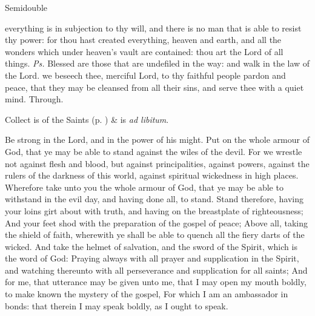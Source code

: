 \label{trinity}
\begin{inhead}
{Semidouble}
\end{inhead}
\par\noindent
{}




\properantiphonfix

\introit
{} everything is in subjection to thy will, and there is no man that is able to resist thy power: for thou hast created everything, heaven and earth, and all the wonders which under heaven's vault are contained: thou art the Lord of all things. \textit{Ps.} Blessed are those that are undefiled in the way: and walk in the law of the Lord.
\collect
{} we beseech thee, merciful Lord, to thy faithful people pardon and peace, that they may be cleansed from all their sins, and serve thee with a quiet mind. Through.
\begin{rubric}
     Collect is of the Saints (p. \pageref{SPSaints}) \&  is \emph{ad libitum}.
\end{rubric}

 Be strong in the Lord, and in the power of his might. Put on the whole armour of God, that ye may be able to stand against the wiles of the devil. For we wrestle not against flesh and blood, but against principalities, against powers, against the rulers of the darkness of this world, against spiritual wickedness in high places. Wherefore take unto you the whole armour of God, that ye may be able to withstand in the evil day, and having done all, to stand. Stand therefore, having your loins girt about with truth, and having on the breastplate of righteousness; And your feet shod with the preparation of the gospel of peace; Above all, taking the shield of faith, wherewith ye shall be able to quench all the fiery darts of the wicked. And take the helmet of salvation, and the sword of the Spirit, which is the word of God: Praying always with all prayer and supplication in the Spirit, and watching thereunto with all perseverance and supplication for all saints; And for me, that utterance may be given unto me, that I may open my mouth boldly, to make known the mystery of the gospel, For which I am an ambassador in bonds: that therein I may speak boldly, as I ought to speak.


